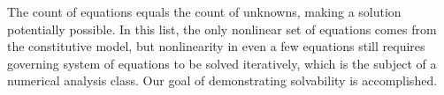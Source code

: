 The count of equations equals the count of unknowns, making a solution potentially possible. In this list, the only nonlinear set of equations comes from the constitutive model, but nonlinearity in even a few equations still requires governing system of equations to be solved iteratively, which is the subject of a numerical analysis class. Our goal of demonstrating solvability is accomplished.

